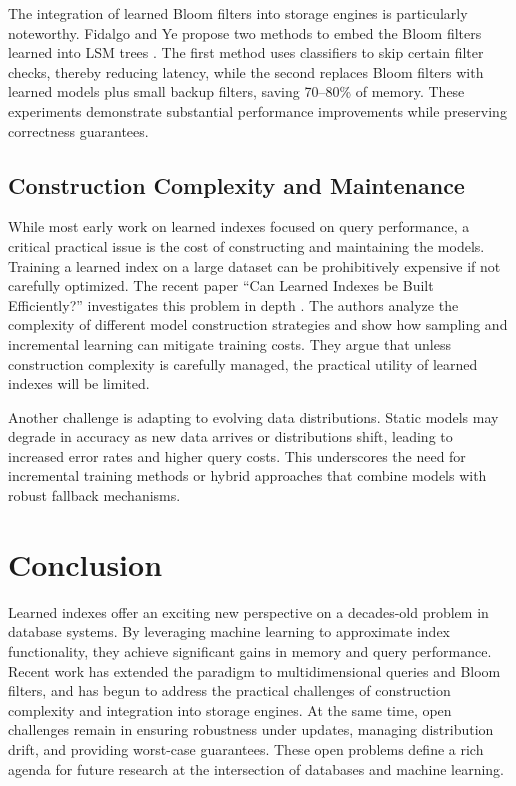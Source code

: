 \documentclass[sigconf]{acmart}
\begin{document}
The integration of learned Bloom filters into storage engines is
particularly noteworthy. Fidalgo and Ye propose two methods to embed
the Bloom filters learned into LSM trees \cite{fidalgo2025learned}. The
first method uses classifiers to skip certain filter checks, thereby
reducing latency, while the second replaces Bloom filters with
learned models plus small backup filters, saving 70--80\% of memory.
These experiments demonstrate substantial performance improvements
while preserving correctness guarantees.

\subsection{Construction Complexity and Maintenance}

While most early work on learned indexes focused on query performance,
a critical practical issue is the cost of constructing and maintaining
the models. Training a learned index on a large dataset can be
prohibitively expensive if not carefully optimized. The recent paper
``Can Learned Indexes be Built Efficiently?'' investigates this
problem in depth \cite{canlearned2024}. The authors analyze the
complexity of different model construction strategies and show how
sampling and incremental learning can mitigate training costs. They
argue that unless construction complexity is carefully managed, the
practical utility of learned indexes will be limited.

Another challenge is adapting to evolving data distributions. Static
models may degrade in accuracy as new data arrives or distributions
shift, leading to increased error rates and higher query costs. This
underscores the need for incremental training methods or hybrid
approaches that combine models with robust fallback mechanisms.

\section{Conclusion}

Learned indexes offer an exciting new perspective on a decades-old
problem in database systems. By leveraging machine learning to
approximate index functionality, they achieve significant gains in
memory and query performance. Recent work has extended the paradigm to
multidimensional queries and Bloom filters, and has begun to address
the practical challenges of construction complexity and integration
into storage engines. At the same time, open challenges remain in
ensuring robustness under updates, managing distribution drift, and
providing worst-case guarantees. These open problems define a rich
agenda for future research at the intersection of databases and
machine learning.




\end{document}
